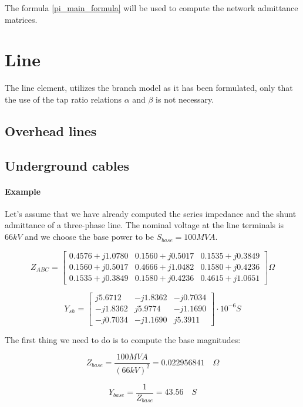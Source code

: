 \documentclass[a4paper,twoside]{tufte-book}
\begin{document}
The formula \ref{pi_main_formula} will be used to compute the network admittance matrices.


\section{Line}

The line element, utilizes the branch model as it has been formulated, only that the use of the tap ratio relations $\alpha$ and $\beta$ is not necessary.


\subsection{Overhead lines}


\subsection{Underground cables}


\paragraph{Example}

Let's assume that we have already computed the series impedance and the shunt admittance of a three-phase line. The nominal voltage at the line terminals is $66kV$ and we choose the base power to be $S_{base}=100MVA$.

$$
Z_{ABC} = \left[ \begin{array}{ccc}
0.4576 + j 1.0780 & 0.1560 + j0 .5017 & 0.1535 + j 0.3849 \\
0.1560 + j 0.5017 & 0.4666 + j 1.0482 & 0.1580 + j 0.4236 \\ 
0.1535 + j 0.3849 & 0.1580 + j 0.4236 & 0.4615 + j 1.0651
\end{array} \right] \Omega
$$

$$
Y_{sh} = \left[ \begin{array}{ccc}
j5.6712 & -j1.8362 & -j0.7034 \\
-j1.8362 & j5.9774 & -j1.1690 \\ 
-j0.7034 & -j1.1690 & j5.3911
\end{array} \right] \cdot 10^{-6}  S
$$

The first thing we need to do is to compute the base magnitudes:

$$
Z_{base} = \frac{100 MVA}{(66kV)^2} = 0.022956841 \quad \Omega
$$

$$
Y_{base} = \frac{1}{Z_{base}} = 43.56 \quad S
$$
\end{document}
